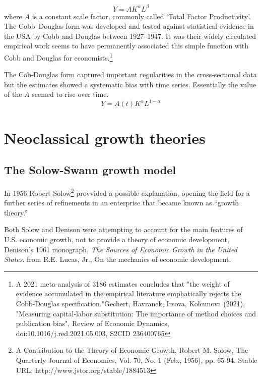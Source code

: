  \[Y=AK^\alpha L^\beta\]
 where $A$ is a constant scale factor, commonly called `Total Factor Productivity'. The Cobb–Douglas form was developed and tested against statistical evidence  in the USA by Cobb and Douglas between 1927–1947. It was  their widely circulated empirical work seems to have permanently associated this simple function with Cobb and Douglas for economists.\footnote{ A 2021 meta-analysis of 3186 estimates concludes that "the weight of evidence accumulated in the empirical literature emphatically rejects the Cobb-Douglas specification."Gechert, Havranek, Irsova, Kolcunova (2021), "Measuring capital-labor substitution: The importance of method choices and publication bias", Review of Economic Dynamics, doi:10.1016/j.red.2021.05.003, S2CID 236400765}

The Cob-Douglas form captured  important regularities in the cross-sectional data but the estimates showed a systematic bias with time series. Essentially the value of the $A$ seemed to rise over time.
 \[Y=A(t)K^\alpha L^{1-\alpha}\]

  \section{Neoclassical growth theories}  

 \subsection{The Solow-Swann growth model}
In 1956 Robert Solow\footnote{A Contribution to the Theory of Economic Growth,  Robert M. Solow, The Quarterly Journal of Economics, Vol. 70, No. 1 (Feb., 1956), pp. 65-94. Stable URL: http://www.jstor.org/stable/1884513} provvided a possible explanation, opening the field for a further series of refinements  in an enterprise that became known as ``growth theory.'' 

{\color{blue}  Both Solow and Denison were attempting to account for the main features of U.S. economic growth, not to provide a theory of economic development,  Denison's 1961 monograph, \textit{The Sources of Economic Growth in the United States}.  from R.E. Lucas, Jr., On the mechanics of economic development.}

